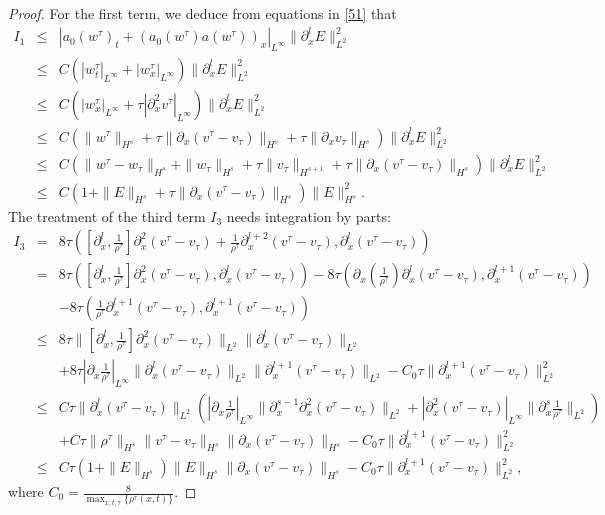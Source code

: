 \documentclass{article}
\theoremstyle{plain}
\begin{document}
\begin{proof}
For the first term, we deduce from equations in \eqref{51} that
\begin{eqnarray*}
  I_1 &\le&  |a_0(w^\tau)_t + (a_0(w^\tau) a(w^\tau))_x|_{L^\infty} \|\partial^l_x E\|_{L^2}^2 \nonumber\\
      &\le& C (|w^\tau_t|_{L^\infty} + |w^\tau_x|_{L^\infty}) \|\partial^l_x E\|_{L^2}^2 \nonumber\\
      &\le& C (|w^\tau_x|_{L^\infty} + \tau |\partial^2_x v^\tau|_{L^\infty}) \|\partial^l_x E\|_{L^2}^2 \nonumber\\
      &\le& C (\|w^\tau\|_{H^s} + \tau \|\partial_x(v^\tau-v_\tau)\|_{H^s} + \tau \|\partial_x v_\tau\|_{H^s} )\|\partial^l_x E\|_{L^2}^2 \nonumber\\
      &\le& C (\|w^\tau-w_\tau\|_{H^s}+\|w_\tau\|_{H^s}+\tau\|v_\tau\|_{H^{s+1}} + \tau \|\partial_x(v^\tau-v_\tau)\|_{H^s}) \|\partial^l_x E\|_{L^2}^2 \nonumber\\
      &\le& C (1+\|E\|_{H^s} + \tau \|\partial_x (v^\tau-v_\tau)\|_{H^s}) \|E\|_{H^s}^2. \label{516}
\end{eqnarray*}
The treatment of the third term $I_3$ needs integration by parts:
\begin{eqnarray*}
  I_3 &=& 8 \tau ([\partial^l_x,\frac{1}{\rho^\tau}] \partial^2_x(v^\tau-v_\tau) + \frac{1}{\rho^\tau} \partial^{l+2}_x(v^\tau-v_\tau),\partial^l_x (v^\tau-v_\tau) )\\
  &=& 8 \tau ([\partial^l_x,\frac{1}{\rho^\tau}] \partial^2_x(v^\tau-v_\tau),\partial^l_x (v^\tau-v_\tau))  -8 \tau(\partial_x (\frac{1}{\rho^\tau}) \partial^l_x(v^\tau-v_\tau),\partial^{l+1}_x (v^\tau-v_\tau)) \\ && -8\tau ( \frac{1}{\rho^\tau} \partial^{l+1}_x(v^\tau-v_\tau), \partial^{l+1}_x (v^\tau-v_\tau)) \\
  &\le& 8\tau \|[\partial^l_x,\frac{1}{\rho^\tau}]\partial^2_x(v^\tau-v_\tau)\|_{L^2} \|\partial^l_x (v^\tau-v_\tau)\|_{L^2} \\ & &+8\tau |\partial_x \frac{1}{\rho^\tau}|_{L^\infty} \|\partial^l_x (v^\tau-v_\tau)\|_{L^2} \|\partial^{l+1}_x(v^\tau-v_\tau)\|_{L^2}  -C_0 \tau \|\partial^{l+1}_x (v^\tau-v_\tau)\|_{L^2}^2\\
  &\le& C\tau \|\partial^l_x (v^\tau-v_\tau)\|_{L^2} (|\partial_x \frac{1}{\rho^\tau}|_{L^\infty} \|\partial_x^{s-1} \partial^2_x(v^\tau-v_\tau)\|_{L^2} + |\partial^2_x (v^\tau-v_\tau)|_{L^\infty} \|\partial^s_x \frac{1}{\rho^\tau}\|_{L^2})  \\ & & + C\tau \|\rho^\tau\|_{H^s} \|v^\tau-v_\tau\|_{H^s}\|\partial_x (v^\tau-v_\tau)\|_{H^s} -C_0 \tau\|\partial^{l+1}_x (v^\tau-v_\tau)\|_{L^2}^2\\
  &\le& C\tau (1+ \|E\|_{H^s})\|E\|_{H^s} \|\partial_x (v^\tau-v_\tau)\|_{H^s}-C_0 \tau \|\partial^{l+1}_x (v^\tau-v_\tau)\|_{L^2}^2 ,
\end{eqnarray*}
where $C_0 =\frac{ 8}{{\max_{x,t,\tau} \{\rho^\tau(x,t) \}}}$.


\end{proof}
\end{document}
